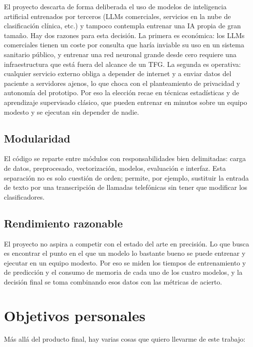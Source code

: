El proyecto descarta de forma deliberada el uso de modelos de inteligencia artificial entrenados por terceros (LLMs comerciales, servicios en la nube de clasificación clínica, etc.) y tampoco contempla entrenar una IA propia de gran tamaño. Hay dos razones para esta decisión. La primera es económica: los LLMs comerciales tienen un coste por consulta que haría inviable su uso en un sistema sanitario público, y entrenar una red neuronal grande desde cero requiere una infraestructura que está fuera del alcance de un TFG. La segunda es operativa: cualquier servicio externo obliga a depender de internet y a enviar datos del paciente a servidores ajenos, lo que choca con el planteamiento de privacidad y autonomía del prototipo. Por eso la elección recae en técnicas estadísticas y de aprendizaje supervisado clásico, que pueden entrenar en minutos sobre un equipo modesto y se ejecutan sin depender de nadie.

\subsection{Modularidad}

El código se reparte entre módulos con responsabilidades bien delimitadas: carga de datos, preprocesado, vectorización, modelos, evaluación e interfaz. Esta separación no es solo cuestión de orden; permite, por ejemplo, sustituir la entrada de texto por una transcripción de llamadas telefónicas sin tener que modificar los clasificadores.

\subsection{Rendimiento razonable}

El proyecto no aspira a competir con el estado del arte en precisión. Lo que busca es encontrar el punto en el que un modelo lo bastante bueno se puede entrenar y ejecutar en un equipo modesto. Por eso se miden los tiempos de entrenamiento y de predicción y el consumo de memoria de cada uno de los cuatro modelos, y la decisión final se toma combinando esos datos con las métricas de acierto.

\section{Objetivos personales}

Más allá del producto final, hay varias cosas que quiero llevarme de este trabajo:

